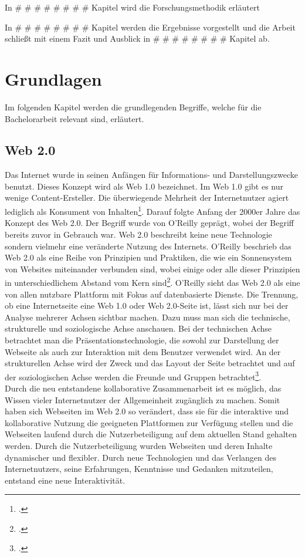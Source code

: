 In \# \# \# \# \# \# \# \# Kapitel wird die Forschungsmethodik erläutert\par

In \# \# \# \# \# \# \# \# Kapitel werden die Ergebnisse vorgestellt und die Arbeit schließt mit einem Fazit und Ausblick in \# \# \# \# \# \# \# \# Kapitel ab.

\chapter{Grundlagen}
\label{ch:Grundlagen}

Im folgenden Kapitel werden die grundlegenden Begriffe, welche für die Bachelorarbeit relevant sind, erläutert. 

\section{Web 2.0}
\label{web2.0}

Das Internet wurde in seinen Anfängen für Informations- und Darstellungszwecke benutzt. Dieses Konzept wird als Web 1.0 bezeichnet. Im Web 1.0 gibt es nur wenige Content-Ersteller. Die überwiegende Mehrheit der Internetnutzer agiert lediglich als Konsument von Inhalten\footcite{unterschiedWeb1u2}. Darauf folgte Anfang der 2000er Jahre das Konzept des Web 2.0. Der Begriff wurde von O'Reilly geprägt, wobei der Begriff bereits zuvor in Gebrauch war. Web 2.0 beschreibt keine neue Technologie sondern vielmehr eine veränderte Nutzung des Internets. O'Reilly beschrieb das Web 2.0 als eine Reihe von Prinzipien und Praktiken, die wie ein Sonnensystem von Websites miteinander verbunden sind, wobei einige oder alle dieser Prinzipien in unterschiedlichem Abstand vom Kern sind\footcite{oreilly}. O'Reilly sieht das Web 2.0 als eine von allen nutzbare Plattform mit Fokus auf datenbasierte Dienste.
Die Trennung, ob eine Internetseite eine Web 1.0 oder Web 2.0-Seite ist, lässt sich nur bei der Analyse mehrerer Achsen sichtbar machen. Dazu muss man sich die technische, strukturelle und soziologische Achse anschauen. Bei der technischen Achse betrachtet man die Präsentationstechnologie, die sowohl zur Darstellung der Webseite als auch zur Interaktion mit dem Benutzer verwendet wird. An der strukturellen Achse wird der Zweck und das Layout der Seite betrachtet und auf der soziologischen Achse werden die Freunde und Gruppen betrachtet\footcite{unterschiedWeb1u2}. \\
Durch die neu entstandene kollaborative Zusammenarbeit ist es möglich, das Wissen vieler Internetnutzer der Allgemeinheit zugänglich zu machen. Somit haben sich Webseiten im Web 2.0 so verändert, dass sie für die interaktive und kollaborative Nutzung die geeigneten Plattformen zur Verfügung stellen und die Webseiten laufend durch die Nutzerbeteiligung auf dem aktuellen Stand gehalten werden. Durch die Nutzerbeteiligung wurden Webseiten und deren Inhalte dynamischer und flexibler.
Durch neue Technologien und das Verlangen des Internetnutzers, seine Erfahrungen, Kenntnisse und Gedanken mitzuteilen, entstand eine neue Interaktivität.


